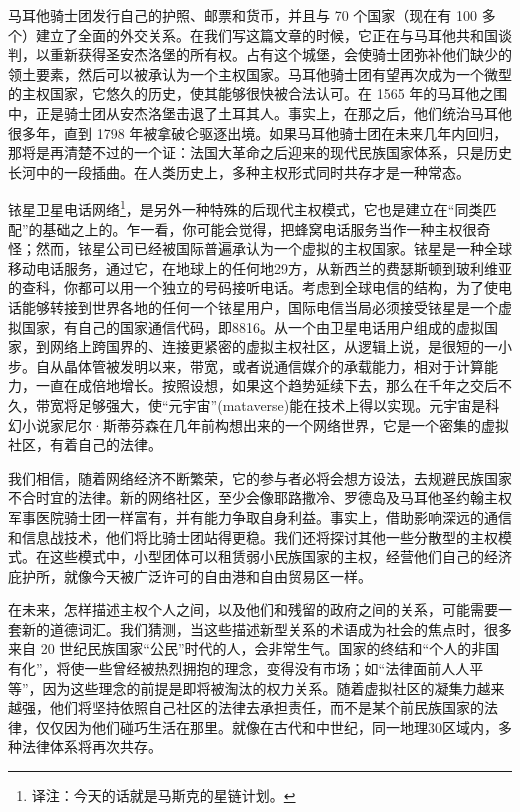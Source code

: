 马耳他骑士团发行自己的护照、邮票和货币，并且与 70 个国家（现在有 100 多个）建立了全面的外交关系。在我们写这篇文章的时候，它正在与马耳他共和国谈判，以重新获得圣安杰洛堡的所有权。占有这个城堡，会使骑士团弥补他们缺少的领土要素，然后可以被承认为一个主权国家。马耳他骑士团有望再次成为一个微型的主权国家，它悠久的历史，使其能够很快被合法认可。在 1565 年的马耳他之围中，正是骑士团从安杰洛堡击退了土耳其人。事实上，在那之后，他们统治马耳他很多年，直到 1798 年被拿破仑驱逐出境。如果马耳他骑士团在未来几年内回归，那将是再清楚不过的一个证：法国大革命之后迎来的现代民族国家体系，只是历史长河中的一段插曲。在人类历史上，多种主权形式同时共存才是一种常态。


铱星卫星电话网络\footnote{译注：今天的话就是马斯克的星链计划。}，是另外一种特殊的后现代主权模式，它也是建立在“同类匹配”的基础之上的。乍一看，你可能会觉得，把蜂窝电话服务当作一种主权很奇怪；然而，铱星公司已经被国际普遍承认为一个虚拟的主权国家。铱星是一种全球移动电话服务，通过它，在地球上的任何地29方，从新西兰的费瑟斯顿到玻利维亚的查科，你都可以用一个独立的号码接听电话。考虑到全球电信的结构，为了使电话能够转接到世界各地的任何一个铱星用户，国际电信当局必须接受铱星是一个虚拟国家，有自己的国家通信代码，即8816。从一个由卫星电话用户组成的虚拟国家，到网络上跨国界的、连接更紧密的虚拟主权社区，从逻辑上说，是很短的一小步。自从晶体管被发明以来，带宽，或者说通信媒介的承载能力，相对于计算能力，一直在成倍地增长。按照设想，如果这个趋势延续下去，那么在千年之交后不久，带宽将足够强大，使“元宇宙”(mataverse)能在技术上得以实现。元宇宙是科幻小说家尼尔·斯蒂芬森在几年前构想出来的一个网络世界，它是一个密集的虚拟社区，有着自己的法律。


我们相信，随着网络经济不断繁荣，它的参与者必将会想方设法，去规避民族国家不合时宜的法律。新的网络社区，至少会像耶路撒冷、罗德岛及马耳他圣约翰主权军事医院骑士团一样富有，并有能力争取自身利益。事实上，借助影响深远的通信和信息战技术，他们将比骑士团站得更稳。我们还将探讨其他一些分散型的主权模式。在这些模式中，小型团体可以租赁弱小民族国家的主权，经营他们自己的经济庇护所，就像今天被广泛许可的自由港和自由贸易区一样。


在未来，怎样描述主权个人之间，以及他们和残留的政府之间的关系，可能需要一套新的道德词汇。我们猜测，当这些描述新型关系的术语成为社会的焦点时，很多来自 20 世纪民族国家“公民”时代的人，会非常生气。国家的终结和“个人的非国有化”，将使一些曾经被热烈拥抱的理念，变得没有市场；如“法律面前人人平等”，因为这些理念的前提是即将被淘汰的权力关系。随着虚拟社区的凝集力越来越强，他们将坚持依照自己社区的法律去承担责任，而不是某个前民族国家的法律，仅仅因为他们碰巧生活在那里。就像在古代和中世纪，同一地理30区域内，多种法律体系将再次共存。



